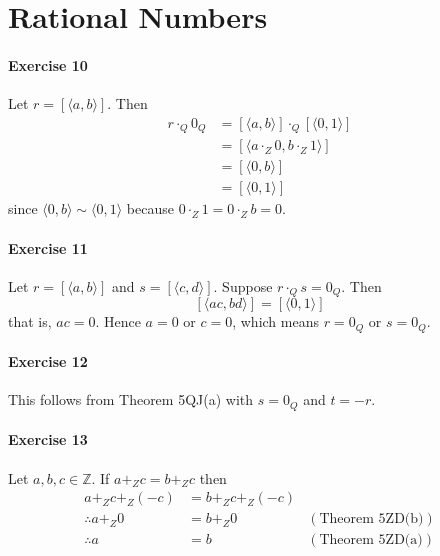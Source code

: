 \documentclass{report}
\begin{document}
    \section{Rational Numbers}

    \paragraph{Exercise 10}
    Let $r = [\langle a,b \rangle]$. Then
    \begin{align*}
        r \cdot_Q 0_Q & = [\langle a,b \rangle] \cdot_Q [\langle 0,1 \rangle] \\
        & = [\langle a \cdot_Z 0, b \cdot_Z 1 \rangle] \\
        & = [\langle 0, b \rangle] \\
        & = [\langle 0,1 \rangle]
    \end{align*}
    since $\langle 0, b \rangle \sim \langle 0,1 \rangle$ because $0 \cdot_Z 1 = 0 \cdot_Z b = 0$.

    \paragraph{Exercise 11}
    Let $r = [\langle a,b \rangle]$ and $s = [\langle c,d \rangle]$. Suppose $r \cdot_Q s = 0_Q$.
    Then
    \[ [\langle ac,bd \rangle] = [\langle 0, 1 \rangle] \]
    that is, $ac = 0$. Hence $a = 0$ or $c = 0$, which means $r = 0_Q$ or $s = 0_Q$.

    \paragraph{Exercise 12}
    This follows from Theorem 5QJ(a) with $s = 0_Q$ and $t = -r$.

    \paragraph{Exercise 13}
    Let $a,b,c \in \mathbb{Z}$. If $a +_Z c = b +_Z c$ then
    \begin{align*}
        a +_Z c +_Z (-c) & = b +_Z c +_Z (-c) \\
        \therefore a +_Z 0 & = b +_Z 0 & (\text{Theorem 5ZD(b)}) \\
        \therefore a & = b & (\text{Theorem 5ZD(a)})
    \end{align*}
    
\end{document}
